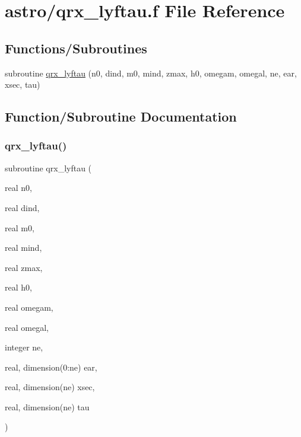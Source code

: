 \hypertarget{qrx__lyftau_8f}{}\section{astro/qrx\+\_\+lyftau.f File Reference}
\label{qrx__lyftau_8f}
\subsection*{Functions/\+Subroutines}
\begin{DoxyCompactItemize}
\item 
subroutine \hyperlink{qrx__lyftau_8f_aa3197ac8aadc7283785aa0984b8b3483}{qrx\+\_\+lyftau} (n0, dind, m0, mind, zmax, h0, omegam, omegal, ne, ear, xsec, tau)
\end{DoxyCompactItemize}


\subsection{Function/\+Subroutine Documentation}
\mbox{\label{qrx__lyftau_8f_aa3197ac8aadc7283785aa0984b8b3483}} 
\subsubsection{\texorpdfstring{qrx\+\_\+lyftau()}{qrx\_lyftau()}}
{\footnotesize\ttfamily subroutine qrx\+\_\+lyftau (\begin{DoxyParamCaption}\item[{real}]{n0,  }\item[{real}]{dind,  }\item[{real}]{m0,  }\item[{real}]{mind,  }\item[{real}]{zmax,  }\item[{real}]{h0,  }\item[{real}]{omegam,  }\item[{real}]{omegal,  }\item[{integer}]{ne,  }\item[{real, dimension(0\+:ne)}]{ear,  }\item[{real, dimension(ne)}]{xsec,  }\item[{real, dimension(ne)}]{tau }\end{DoxyParamCaption})}

